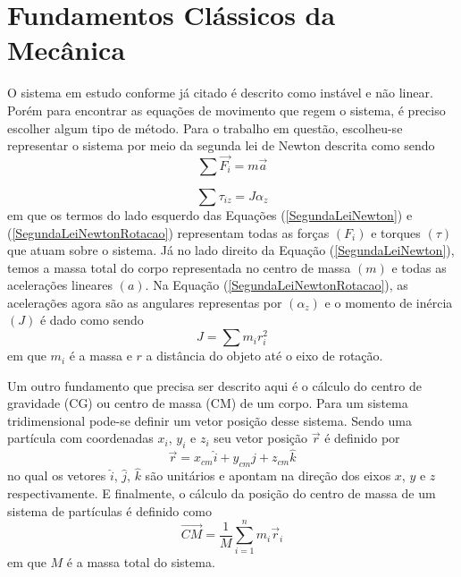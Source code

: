 \section{Fundamentos Clássicos da Mecânica}\label{sec:FundamentoClassicosMecanica}

O sistema em estudo conforme já citado é descrito como instável e não linear. Porém para encontrar as equações de movimento que regem o sistema, é preciso escolher algum tipo de método. Para o trabalho em questão, escolheu-se representar o sistema por meio da segunda lei de Newton descrita como sendo
\begin{equation}\label{SegundaLeiNewton}
    \sum \overrightarrow{F_i} = m\overrightarrow{a}
\end{equation}

\begin{equation}\label{SegundaLeiNewtonRotacao}
    \sum \tau_{iz} = J\alpha_z 
\end{equation}
em que os termos do lado esquerdo das Equações (\ref{SegundaLeiNewton}) e (\ref{SegundaLeiNewtonRotacao}) representam todas as forças $(F_i)$ e torques $(\tau)$ que atuam sobre o sistema. Já no lado direito da Equação (\ref{SegundaLeiNewton}), temos a massa total do corpo representada no centro de massa $(m)$ e todas as acelerações lineares $(a)$. Na Equação (\ref{SegundaLeiNewtonRotacao}), as acelerações agora são as angulares representas por $(\alpha_z)$ e o momento de inércia $(J)$ é dado como sendo
\begin{equation}
    J = \sum m_ir_i^2
\end{equation}
em que $m_i$ é a massa e $r$ a distância do objeto até o eixo de rotação.

Um outro fundamento que precisa ser descrito aqui é o cálculo do centro de gravidade (CG) ou centro de massa (CM) de um corpo. Para um sistema tridimensional pode-se definir um vetor posição desse sistema. Sendo uma partícula com coordenadas $x_i$, $y_i$ e $z_i$ seu vetor posição $\overrightarrow{r}$ é definido por
\begin{equation*}\label{eq:eqVetorPosicaoCentroMassa}
    \overrightarrow{r} = x_{cm}\hat{i} + y_{cm}\hat{j} + z_{cm}\hat{k}
\end{equation*}
no qual os vetores $\hat{i}$, $\hat{j}$, $\hat{k}$ são unitários e apontam na direção dos eixos $x$, $y$ e $z$ respectivamente. E finalmente, o cálculo da posição do centro de massa de um sistema de partículas é definido como
\begin{equation}
    \overrightarrow{CM} = \frac{1}{M} \sum\limits_{i=1}^{n} m_i\overrightarrow{r}_i
\end{equation}
em que $M$ é a massa total do sistema.

